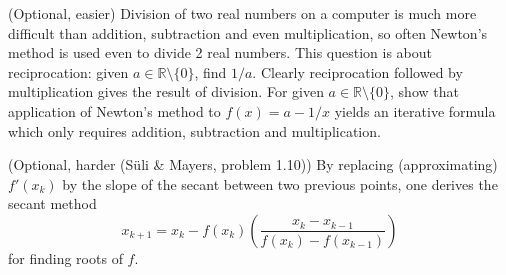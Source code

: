 \documentclass[answers]{exam}
\begin{document}
\begin{questions}
\question%
(Optional, easier) Division of two real numbers on a computer is much more difficult than addition, subtraction and even multiplication, so often Newton's method is used even to divide 2 real numbers. This question is about reciprocation: given $a \in \mathbb{R}\setminus\{0\}$, find $1 / a$. Clearly reciprocation followed by multiplication gives the result of division. For given $a \in \mathbb{R}\setminus\{0\}$, show that application of Newton's method to $f(x)=a-1 / x$ yields an iterative formula which only requires addition, subtraction and multiplication.



\question%
(Optional, harder (Süli \& Mayers, problem 1.10)) By replacing (approximating) $f'\left(x_{k}\right)$ by the slope of the secant between two previous points, one derives the secant method \[
	x_{k+1}=x_{k}-f\left(x_{k}\right)\left(\frac{x_{k}-x_{k-1}}{f\left(x_{k}\right)-f\left(x_{k-1}\right)}\right)
\] for finding roots of $f$.




\end{questions}
\end{document}
